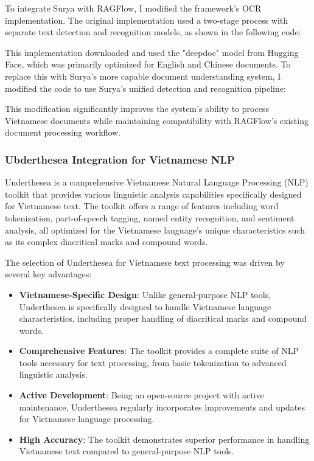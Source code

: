\documentclass[../Main.tex]{subfiles}
\begin{document}
To integrate Surya with RAGFlow, I modified the framework's OCR implementation. The original implementation used a two-stage process with separate text detection and recognition models, as shown in the following code:



This implementation downloaded and used the "deepdoc" model from Hugging Face, which was primarily optimized for English and Chinese documents. To replace this with Surya's more capable document understanding system, I modified the code to use Surya's unified detection and recognition pipeline:



This modification significantly improves the system's ability to process Vietnamese documents while maintaining compatibility with RAGFlow's existing document processing workflow.

\subsubsection{Ubderthesea Integration for Vietnamese NLP}
\label{section:5.1.2.3_ubderthesea_integration_for_vietnamese_nlp}

Underthesea is a comprehensive Vietnamese Natural Language Processing (NLP) toolkit that provides various linguistic analysis capabilities specifically designed for Vietnamese text. The toolkit offers a range of features including word tokenization, part-of-speech tagging, named entity recognition, and sentiment analysis, all optimized for the Vietnamese language's unique characteristics such as its complex diacritical marks and compound words.

The selection of Underthesea for Vietnamese text processing was driven by several key advantages:

\begin{itemize}
    \item \textbf{Vietnamese-Specific Design}: Unlike general-purpose NLP tools, Underthesea is specifically designed to handle Vietnamese language characteristics, including proper handling of diacritical marks and compound words.
    
    \item \textbf{Comprehensive Features}: The toolkit provides a complete suite of NLP tools necessary for text processing, from basic tokenization to advanced linguistic analysis.
    
    \item \textbf{Active Development}: Being an open-source project with active maintenance, Underthesea regularly incorporates improvements and updates for Vietnamese language processing.
    
    \item \textbf{High Accuracy}: The toolkit demonstrates superior performance in handling Vietnamese text compared to general-purpose NLP tools.
\end{itemize}
\end{document}
